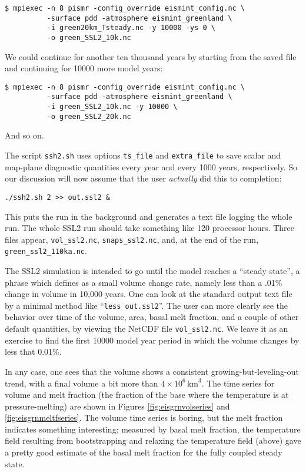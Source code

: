 \begin{verbatim}
$ mpiexec -n 8 pismr -config_override eismint_config.nc \
          -surface pdd -atmosphere eismint_greenland \
          -i green20km_Tsteady.nc -y 10000 -ys 0 \
          -o green_SSL2_10k.nc
\end{verbatim}%
\noindent We could continue for another ten thousand years by starting from the saved file and continuing for 10000 more model years:
\begin{verbatim}
$ mpiexec -n 8 pismr -config_override eismint_config.nc \
          -surface pdd -atmosphere eismint_greenland \
          -i green_SSL2_10k.nc -y 10000 \
          -o green_SSL2_20k.nc
\end{verbatim}%
\noindent And so on.

The script \texttt{ssh2.sh} uses options \texttt{ts_file} and \texttt{extra_file} to save scalar and map-plane diagnostic quantities every year and every 1000 years, respectively. So our discussion will now assume that the user \emph{actually} did this to completion:

\begin{verbatim}
./ssh2.sh 2 >> out.ssl2 &
\end{verbatim}

\noindent This puts the run in the background and generates a text file logging the whole run.  The whole SSL2 run should take something like 120 processor hours.  Three files appear, \texttt{vol_ssl2.nc}, \texttt{snaps_ssl2.nc}, and, at the end of the run, \texttt{green_ssl2_110ka.nc}.

The SSL2 simulation is intended to go until the model reaches a ``steady state'', a phrase which \cite{RitzEISMINT} defines as a small volume change rate, namely less than a .01\% change in volume in 10,000 years.  One can look at the standard output text file by a minimal method like ``\texttt{less out.ssl2}''.  The user can more clearly see the behavior over time of the volume, area, basal melt fraction, and a couple of other default quantities, by viewing the NetCDF file \texttt{vol_ssl2.nc}.  We leave it as an exercise to find the first 10000 model year period in which the volume changes by less that 0.01\%.

In any case, one sees that the volume shows a consistent growing-but-leveling-out trend, with a final volume a bit more than $4 \times 10^{6}\,\text{km}^3$.  The time series for volume and melt fraction (the fraction of the base where the temperature is at pressure-melting) are shown in Figures \ref{fig:eisgrnvolseries} and \ref{fig:eisgrnmeltfseries}.  The volume time series is boring, but the melt fraction indicates something interesting: measured by basal melt fraction, the temperature field resulting from bootstrapping and relaxing the temperature field (above) gave a pretty good estimate of the basal melt fraction for the fully coupled steady state.

